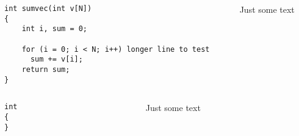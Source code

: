 \documentclass{beamer}
\begin{document}
\begin{frame}[fragile]
    \begin{columns}[onlytextwidth]
        \begin{column}{0.4\textwidth}
            \begin{lrbox}{\listingboxname}
                \begin{adjustbox}{max width=\linewidth, margin=0pt}
                \begin{lstlisting}
int sumvec(int v[N])
{
    int i, sum = 0;

    for (i = 0; i < N; i++) longer line to test
      sum += v[i];
    return sum;
}  
                \end{lstlisting}
                \end{adjustbox}
            \end{lrbox}
            \colorbox{cyan}{\usebox\listingboxname}
        \end{column}
        \begin{column}{0.5\textwidth}
            Just some text
        \end{column}
    \end{columns}
\end{frame}

\begin{frame}[fragile]
    \begin{columns}[onlytextwidth]
        \begin{column}{0.4\textwidth}
                \begin{lstlisting}[linewidth=\textwidth,
                     backgroundcolor=\color{cyan}]
int 
{
}  
                \end{lstlisting}
        \end{column}
        \begin{column}{0.5\textwidth}
            Just some text
        \end{column}
    \end{columns}
\end{frame}
\end{document}
